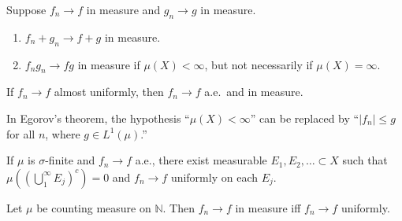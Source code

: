 	\begin{exercise}[Folland 2.38]
		Suppose $f_n \to f$ in measure and $g_n \to g$ in measure.
		\begin{enumerate}[label=\textbf{\alph*.}]
			\item $f_n + g_n \to f + g$ in measure.
			\item $f_n g_n \to fg$ in measure if $\mu(X) < \infty$, but not necessarily if $\mu(X) = \infty$.
		\end{enumerate}
	\end{exercise}
	\begin{solution}

	\end{solution}

	\begin{exercise}[Folland 2.39]
		If $f_n \to f$ almost uniformly, then $f_n \to f$ a.e.\ and in measure.
	\end{exercise}
	\begin{solution}

	\end{solution}

	\begin{exercise}[Folland 2.40]
		In Egorov's theorem, the hypothesis ``$\mu(X) < \infty$'' can be replaced by ``$|f_n| \le g$ for all $n$, where $g \in L^1(\mu)$.''
	\end{exercise}
	\begin{solution}

	\end{solution}

	\begin{exercise}[Folland 2.41]
		If $\mu$ is $\sigma$-finite and $f_n \to f$ a.e., there exist measurable $E_1, E_2, \dots \subset X$ such that $\mu((\bigcup_1^\infty E_j)^c) = 0$ and $f_n \to f$ uniformly on each $E_j$.
	\end{exercise}
	\begin{solution}

	\end{solution}

	\begin{exercise}[Folland 2.42]
		Let $\mu$ be counting measure on $\mathbb{N}$. Then $f_n \to f$ in measure iff $f_n \to f$ uniformly.
	\end{exercise}
	\begin{solution}

	\end{solution}

